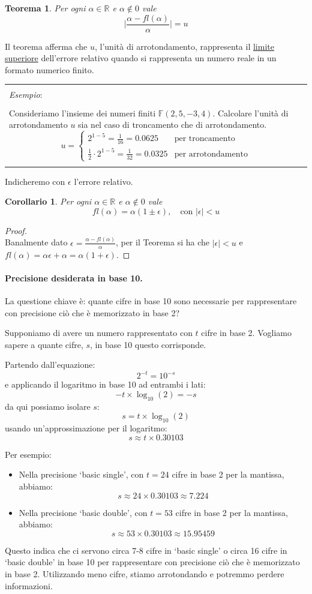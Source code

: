 \documentclass{article}
\newtheorem*{theorem}{\color{green}\textbf{Teorema}}
\newtheorem*{corollary}{\color{violet}\textbf{Corollario}}
\newenvironment{example}
{\begin{center}
        \begin{tabular}{|p{0.9\textwidth}|}
            \hline \\ 
            \textit{Esempio}: \\\\ 
        }
        {
            \\\\ \hline
        \end{tabular}
    \end{center}
}
\begin{document}
\begin{theorem}
   Per ogni $\alpha\in \mathbb{R}$ e $\alpha\notin0$ vale
   $$\Big\lvert \frac{\alpha-fl(\alpha)}{\alpha}\Big\rvert=u$$
\end{theorem}
Il teorema afferma che $u$, l'unità di arrotondamento, rappresenta il
\underline{limite superiore} dell'errore relativo quando si rappresenta 
un numero reale in un formato numerico finito.
\begin{example}
    Consideriamo l'insieme dei numeri finiti $\mathbb{F}(2,5,-3,4)$. Calcolare l'unità di arrotondamento $u$ sia nel caso di troncamento che di
    arrotondamento.
    $$u=\begin{cases}
        2^{1-5}=\frac{1}{16}=0.0625 & \text{per
        troncamento} \\
        \frac{1}{2}\cdot2^{1-5}=\frac{1}{32}=0.0325 & \text{per arrotondamento}
    \end{cases}$$
\end{example}
Indicheremo con $\epsilon$ l'errore relativo.
\begin{corollary}
    Per ogni $\alpha\in \mathbb{R}$ e $\alpha\notin0$ vale 
    $$  fl(\alpha)=\alpha(1\pm\epsilon),\quad \text{con }\lvert 
      \epsilon\rvert<u $$
\end{corollary} 
\begin{proof}\leavevmode\\
    Banalmente dato $\epsilon=\frac{\alpha-fl(\alpha)}{\alpha}$,
    per il Teorema si ha che $\lvert \epsilon\rvert<u$ e
    $fl(\alpha)=\alpha\epsilon+\alpha=\alpha(1+\epsilon)$.
\end{proof}
\paragraph{Precisione desiderata in base 10.}
La questione chiave è: quante cifre in base 10 sono necessarie per
rappresentare con precisione ciò che è memorizzato in base 2? 

Supponiamo di avere un numero rappresentato con $t$ cifre in base 2. Vogliamo
sapere a quante cifre, $s$, in base 10 questo corrisponde.

Partendo dall'equazione:
$$2^{-t}=10^{-s}$$
e applicando il logaritmo in base 10 ad entrambi i lati:
$$-t\times\log_{10}(2)=-s$$
da qui possiamo isolare $s$:
$$s=t\times\log_{10}(2)$$
usando un'approssimazione per il logaritmo:
$$s \approx t \times 0.30103$$

Per esempio:
\begin{itemize}
\item Nella precisione `basic single', con \( t = 24 \) cifre in base 2 per la mantissa, abbiamo:
$$s \approx 24 \times 0.30103 \approx 7.224$$
\item Nella precisione `basic double', con \( t = 53 \) cifre in base 2 per la mantissa, abbiamo:
$$s \approx 53 \times 0.30103 \approx 15.95459$$
\end{itemize}
Questo indica che ci servono circa 7-8 cifre in `basic single' o circa 16
cifre in `basic double' in base 10 per rappresentare con
precisione ciò che è memorizzato in base 2. Utilizzando meno cifre, stiamo
arrotondando e potremmo perdere informazioni.
\end{document}
